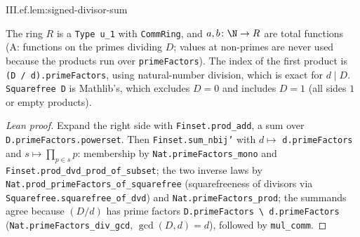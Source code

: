 \begin{lemma}
\end{lemma}
\begin{tfformal}{III.ef.lem:signed-divisor-sum}
\begin{tffidelity}
The ring $R$ is a \texttt{Type u\_1} with \texttt{CommRing}, and $a,b\colon\N\to R$ are total functions (A: functions on the primes dividing $D$; values at non-primes are never used because the products run over \texttt{primeFactors}). The index of the first product is \texttt{(D / d).primeFactors}, using natural-number division, which is exact for $d\mid D$. \texttt{Squarefree D} is Mathlib's, which excludes $D=0$ and includes $D=1$ (all sides $1$ or empty products).
\end{tffidelity}
\end{tfformal}
\begin{proof}[Lean proof]
Expand the right side with \texttt{Finset.prod\_add}, a sum over \texttt{D.primeFactors.powerset}. Then \texttt{Finset.sum\_nbij'} with $d\mapsto$ \texttt{d.primeFactors} and $s\mapsto\prod_{p\in s}p$: membership by \texttt{Nat.primeFactors\_mono} and \texttt{Finset.prod\_dvd\_prod\_of\_subset}; the two inverse laws by \texttt{Nat.prod\_primeFactors\_of\_squarefree} (squarefreeness of divisors via \texttt{Squarefree.squarefree\_of\_dvd}) and \texttt{Nat.primeFactors\_prod}; the summands agree because $(D/d)$ has prime factors \texttt{D.primeFactors \textbackslash\ d.primeFactors} (\texttt{Nat.primeFactors\_div\_gcd}, $\gcd(D,d)=d$), followed by \texttt{mul\_comm}.
\end{proof}

